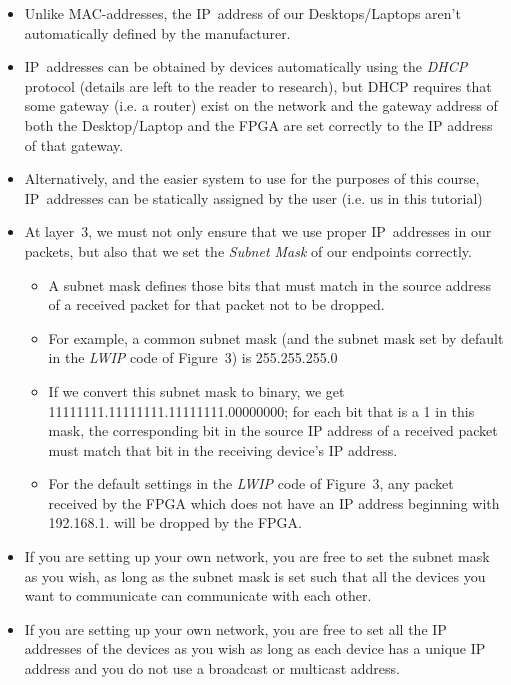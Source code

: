 \documentclass[11pt]{article}
\begin{document}
\begin{itemize}
    \begin{itemize}
        \item Unlike MAC-addresses, the IP~address of our Desktops/Laptops aren't automatically defined by the manufacturer.
        \item IP~addresses can be obtained by devices automatically using the \textit{DHCP} protocol (details are left to the reader to research), but DHCP requires that some gateway (i.e. a router) exist on the network and the gateway address of both the Desktop/Laptop and the FPGA are set correctly to the IP address of that gateway.
        \item Alternatively, and the easier system to use for the purposes of this course, IP~addresses can be statically assigned by the user (i.e. us in this tutorial)
        \item At layer~3, we must not only ensure that we use proper IP~addresses in our packets, but also that we set the \textit{Subnet Mask} of our endpoints correctly. 
        \begin{itemize}
            \item A subnet mask defines those bits that must match in the source address of a received packet for that packet not to be dropped.
            \item For example, a common subnet mask (and the subnet mask set by default in the \textit{LWIP} code of Figure~3) is 255.255.255.0
            \item If we convert this subnet mask to binary, we get 11111111.11111111.11111111.00000000; for each bit that is a 1 in this mask, the corresponding bit in the source IP address of a received packet must match that bit in the receiving device's IP address.
            \item For the default settings in the \textit{LWIP} code of Figure~3, any packet received by the FPGA which does not have an IP address beginning with 192.168.1. will be dropped by the FPGA.
        \end{itemize}
        \item If you are setting up your own network, you are free to set the subnet mask as you wish, as long as the subnet mask is set such that all the devices you want to communicate can communicate with each other.
        \item If you are setting up your own network, you are free to set all the IP addresses of the devices as you wish as long as each device has a unique IP address and you do not use a broadcast or multicast address.
        \begin{itemize}

\end{itemize}
\end{itemize}
\end{itemize}
\end{document}
